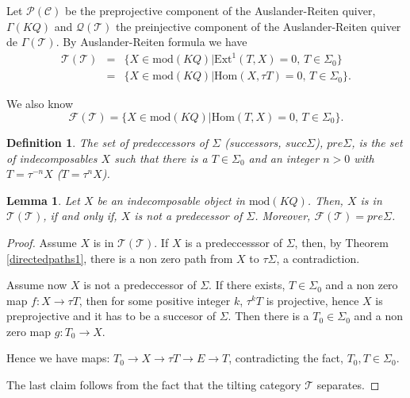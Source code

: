 \documentclass{amsart}
\theoremstyle{plain}
\newtheorem{definition}{Definition}
\newtheorem{lemma}{Lemma}
\numberwithin{equation}{section}
\begin{document}
Let $\mathcal{P}(\mathcal{C})$ be the preprojective component of the
Auslander-Reiten quiver, $\Gamma (KQ)$ and $\mathcal{Q}(\mathcal{T})$ the
preinjective component of the Auslander-Reiten quiver de $\Gamma (\mathcal{T})$. By Auslander-Reiten formula we have
\begin{eqnarray*}
\mathscr{T}(\mathcal{T})&=&\{X\in \mathrm{mod}(KQ)|\mathrm{Ext}^{1}(T,X)=0\text{, }T\in \Sigma _{0}\} \\
{} &=&\{X\in \mathrm{mod}(KQ)|\mathrm{Hom}(X,\tau T)=0\text{, }T\in \Sigma
_{0}\}.
\end{eqnarray*}

We also know\begin{equation*}
\mathscr{F}(\mathcal{T})=\{X\in \mathrm{mod}(KQ)|\mathrm{Hom}(T,X)=0\text{, }T\in \Sigma _{0}\}\text{.}
\end{equation*}

\begin{definition}
The set of predeccessors of $\Sigma $ (successors, $succ\Sigma $), $pre\Sigma $, is the set of indecomposables $X$ such that there is a $T\in
\Sigma _{0}$ and an integer $n>0$ with $T=\tau ^{-n}X$ ($T=\tau ^{n}X$).
\end{definition}

\begin{lemma}
Let $X$ be an indecomposable object in $\mathrm{mod}(KQ)$. Then, $X$ is in $\mathscr{T}(\mathcal{T})$, if and only if, $X$ is not a predecessor of $\Sigma $. Moreover, $\mathscr{F}(\mathcal{T})=pre\Sigma $.
\end{lemma}

\begin{proof}
Assume $X$ is in $\mathscr{T}(\mathcal{T})$. If $X$ is a predeccesssor of $\Sigma $, then, by Theorem \ref{directedpaths1}, there is a non zero path
from $X$ to $\tau \Sigma $, a contradiction.

Assume now $X$ is not a predeccessor of $\Sigma $. If there exists, $T\in
\Sigma _{0}$ and a non zero map $f:X\rightarrow \tau T$, then for some
positive integer $k$, $\tau ^{k}T$ is projective, hence $X$ is preprojective
and it has to be a succesor of $\Sigma $. Then there is a $T_{0}\in \Sigma
_{0}$ and a non zero map $g:T_{0}\rightarrow X.$

Hence we have maps: $T_{0}\rightarrow X\rightarrow \tau T\rightarrow
E\rightarrow T$, contradicting the fact, $T_{0},T\in \Sigma _{0}.$

The last claim follows from the fact that the tilting category $\mathcal{T}$
separates.
\end{proof}
\end{document}
